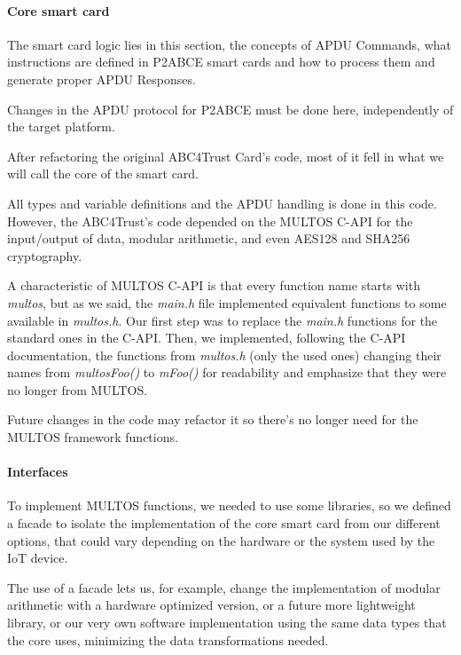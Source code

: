 \hfil

\paragraph{Core smart card}

The smart card logic lies in this section, the concepts of APDU Commands, what instructions are defined in P2ABCE smart cards and how to process them and generate proper APDU Responses.

Changes in the APDU protocol for P2ABCE must be done here, independently of the target platform.

After refactoring the original ABC4Trust Card's code, most of it fell in what we will call the core of the smart card.

All types and variable definitions and the APDU handling is done in this code.
However, the ABC4Trust's code depended on the MULTOS C-API for the input/output of data, modular arithmetic, and even AES128 and SHA256 cryptography.

A characteristic of MULTOS C-API is that every function name starts with \textit{multos}, but as we said, the \textit{main.h} file implemented equivalent functions to some available in \textit{multos.h}. Our first step was to replace the \textit{main.h} functions for the standard ones in the C-API. Then, we implemented, following the C-API documentation, the functions from \textit{multos.h} (only the used ones) changing their names from \textit{multosFoo()} to \textit{mFoo()} for readability and emphasize that they were no longer from MULTOS.

Future changes in the code may refactor it so there's no longer need for the MULTOS framework functions.


\paragraph{Interfaces}

To implement MULTOS functions, we needed to use some libraries, so we defined a facade to isolate the implementation of the core smart card from our different options, that could vary depending on the hardware or the system used by the IoT device.

The use of a facade lets us, for example, change the implementation of modular arithmetic with a hardware optimized version, or a future more lightweight library, or our very own software implementation using the same data types that the core uses, minimizing the data transformations needed.

